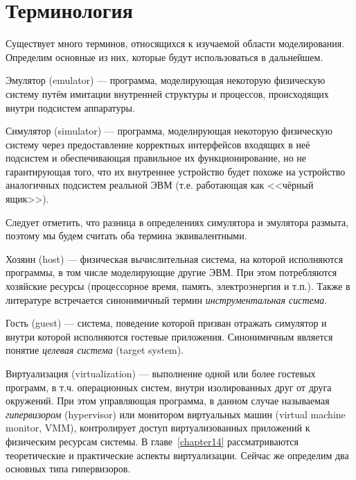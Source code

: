 \section{Терминология}

Существует много терминов, относящихся к изучаемой области моделирования. Определим основные из них, которые будут использоваться в дальнейшем.

\begin{description*}

\item[Эмулятор] (\abbr emulator) --- программа, моделирующая некоторую физическую систему путём имитации внутренней структуры и процессов, происходящих внутри подсистем аппаратуры.

\item[Симулятор] (\abbr simulator) --- программа, моделирующая некоторую физическую систему через предоставление корректных интерфейсов входящих в неё подсистем и обеспечивающая правильное их функционирование, но не гарантирующая того, что их внутреннее устройство будет похоже на устройство аналогичных подсистем реальной ЭВМ (т.е. работающая как <<чёрный ящик>>). 

Следует отметить, что разница в определениях симулятора и эмулятора размыта, поэтому мы будем считать оба термина эквивалентными.

\item[Хозяин] (\abbr host) ---  физическая вычислительная система, на которой исполняются программы, в том числе моделирующие другие ЭВМ. При этом потребляются хозяйские ресурсы (процессорное время, память, электроэнергия и т.п.). Также в литературе встречается синонимичный термин \textit{инструментальная система}.

\item[Гость] (\abbr guest) ---  система, поведение которой призван отражать симулятор и внутри которой исполняются гостевые приложения. Синонимичным является понятие \textit{целевая система} (\abbr target system).

\item[Виртуализация] (\abbr virtualization) --- выполнение одной или более гостевых программ, в т.ч. операционных систем, внутри изолированных друг от друга окружений. При этом управляющая программа, в данном случае называемая \textit{гипервизором} (\abbr hypervisor) или монитором виртуальных машин (\abbr virtual machine monitor, VMM), контролирует доступ виртуализованных приложений к физическим ресурсам системы.  В главе~\ref{chapter14} рассматриваются теоретические и практические аспекты виртуализации. Сейчас же определим два основных типа гипервизоров.


\end{description*}
